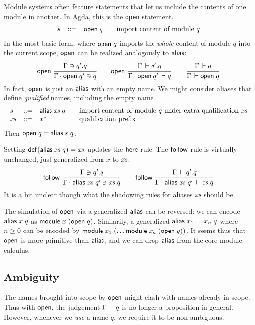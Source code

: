 \documentclass{article}
\theoremstyle{definition}
\theoremstyle{plain}
\theoremstyle{remark}
\begin{document}
Module systems often feature statements that let us include the
contents of one module in another.  In Agda, this is the \texttt{open}
statement.
\[
\begin{array}{lrl@{\qquad}l}
  s & ::= & \mopen q & \mbox{import content of module $q$}
\end{array}
\]
In the most basic form, where $\mathsf{open}\;q$ imports the \emph{whole}
content of module $q$ into the current scope, $\mathsf{open}$ can be realized
analogously to $\mathsf{alias}$:
\[
  \nru{\ropen
     }{\Contains \Gamma {q'.q}
     }{\Contains {\Gamma \sep \mopen {q'}} q}
\qquad
  \nru{\ropen
     }{\Declares \Gamma {q'.q}
     }{\Declares {\Gamma \sep \mopen {q'}} q}
\qquad
  \ru{\Declares \Gamma q
    }{\WContent \Gamma {\mopen q}}
\]
In fact, $\mathsf{open}$ is just an $\mathsf{alias}$ with an empty name.
We might consider aliases that define \emph{qualified} names,
including the empty name.
\[
\begin{array}{lrl@{\qquad}l}
  s & ::= & \malias \vxs q & \mbox{import content of module $q$ under
                              extra qualification $\vxs$} \\
  \vxs & ::= & x^*         & \mbox{qualification prefix} \\
\end{array}
\]
Then $\mathsf{open}\;q = \mathsf{alias}\;\varepsilon\;q$.

Setting $\mathop{\mathsf{def}}(\mathsf{alias}\;\mathit{xs}\;q) = \mathit{xs}$ updates the $\mathsf{here}$
rule.  The $\mathsf{follow}$ rule is virtually unchanged, just generalized
from $x$ to $\mathit{xs}$.
\[
  \nru{\rfollow
     }{\Contains \Gamma {q'.q}
     }{\Contains {\Gamma \chop \malias \vxs q'} {\vxs.q}}
\qquad
  \nru{\rfollow
     }{\Declares \Gamma {q'.q}
     }{\Declares {\Gamma \chop \malias \vxs q'} {\vxs.q}}
\]
It is a bit unclear though what the shadowing rules for aliases $\mathit{xs}$
should be.

The simulation of $\mathsf{open}$ via a generalized $\mathsf{alias}$ can be
reversed: we can encode $\mathsf{alias}\;x\;q$ as $\mathsf{module}\;x\;(\mathsf{open}\;q)$.
Similarily, a generalized $\mathsf{alias}\;x_1\dots x_n\;q$ where $n \geq 0$
can be encoded by $\mathsf{module}\;x_1\;(\dots \mathsf{module}\;x_n\;(\mathsf{open}\;q))$.
It seems thus that $\mathsf{open}$ is more primitive than $\mathsf{alias}$, and we
can drop $\mathsf{alias}$ from the core module calculus.


\subsection{Ambiguity}

The names brought into scope by $\mathsf{open}$ might clash with names
already in scope.  Thus with $\mathsf{open}$, the judgement
$\Gamma\,\vdash q$ is no longer a proposition in general.
However, whenever we \emph{use} a name $q$,
we require it to be non-ambiguous.
\end{document}
